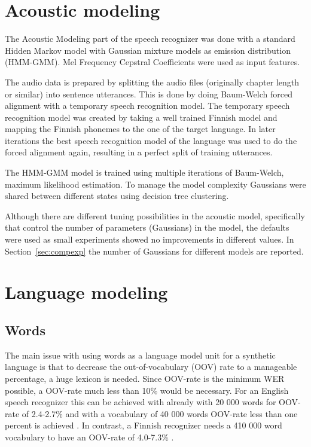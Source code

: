 \documentclass[b5paper]{article}
\begin{document}
\section{Acoustic modeling}
The Acoustic Modeling part of the speech recognizer was done with a standard Hidden Markov model with Gaussian mixture models as emission distribution (HMM-GMM). Mel Frequency Cepstral Coefficients were used as input features. 

The audio data is prepared by splitting the audio files (originally chapter length or similar) into sentence utterances. This is done by doing Baum-Welch forced alignment with a temporary speech recognition model. The temporary speech recognition model was created by taking a well trained Finnish model and mapping the Finnish phonemes to the one of the target language. In later iterations the best speech recognition model of the language was used to do the forced alignment again, resulting in a perfect split of training utterances.

The HMM-GMM model is trained using multiple iterations of Baum-Welch, maximum likelihood estimation. To manage the model complexity Gaussians were shared between different states using decision tree clustering.

Although there are different tuning possibilities in the acoustic model, specifically that control the number of parameters (Gaussians) in the model, the defaults were used as small experiments showed no improvements in different values. In Section~\ref{sec:compexp} the number of Gaussians for different models are reported.


\section{Language modeling}

\subsection{Words}

The main issue with using words as a language model unit for a synthetic language is that to decrease the out-of-vocabulary (OOV) rate to a manageable percentage, a huge lexicon is needed. Since OOV-rate is the minimum WER possible, a OOV-rate much less than 10\% would be necessary. For an English speech recognizer this can be achieved with already with 20 000 words for OOV-rate of 2.4-2.7\% and with a vocabulary of 40 000 words OOV-rate less than one percent is achieved \cite{woodland19951994}. In contrast, a Finnish recognizer needs a 410 000 word vocabulary to have an OOV-rate of 4.0-7.3\% \cite{hirsimaki2006unlimited}.
\end{document}
